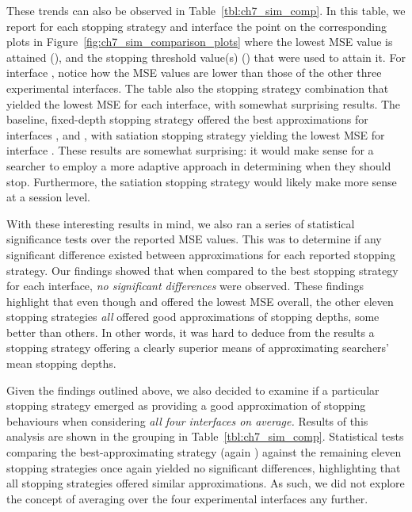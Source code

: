 These trends can also be observed in Table~\ref{tbl:ch7_sim_comp}. In this table, we report for each stopping strategy and interface the point on the corresponding plots in Figure~\ref{fig:ch7_sim_comparison_plots} where the lowest MSE value is attained (), and the stopping threshold value(s) () that were used to attain it. For interface , notice how the MSE values are lower than those of the other three experimental interfaces. The table also  the stopping strategy combination that yielded the lowest MSE for each interface, with somewhat surprising results. The baseline, fixed-depth stopping strategy  offered the best approximations for interfaces ,  and , with satiation stopping strategy  yielding the lowest MSE for interface . These results are somewhat surprising: it would make sense for a searcher to employ a more adaptive approach in determining when they should stop. Furthermore, the satiation stopping strategy would likely make more sense at a session level.


With these interesting results in mind, we also ran a series of statistical significance tests over the reported MSE values. This was to determine if any significant difference existed between approximations for each reported stopping strategy. Our findings showed that when compared to the best stopping strategy for each interface, \emph{no significant differences} were observed. These findings highlight that even though  and  offered the lowest MSE overall, the other eleven stopping strategies \emph{all} offered good approximations of stopping depths, some better than others. In other words, it was hard to deduce from the results a stopping strategy offering a clearly superior means of approximating searchers' mean stopping depths.

Given the findings outlined above, we also decided to examine if a particular stopping strategy emerged as providing a good approximation of stopping behaviours when considering \emph{all four interfaces on average.} Results of this analysis are shown in the  grouping in Table~\ref{tbl:ch7_sim_comp}. Statistical tests comparing the best-approximating strategy (again ) against the remaining eleven stopping strategies once again yielded no significant differences, highlighting that all stopping strategies offered similar approximations. As such, we did not explore the concept of averaging over the four experimental interfaces any further.

